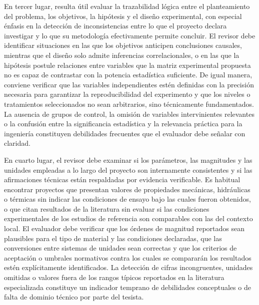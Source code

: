\documentclass[12pt,a4paper]{report}
\begin{document}
En tercer lugar, resulta útil evaluar la trazabilidad lógica entre el planteamiento del problema, los objetivos, la hipótesis y el diseño experimental, con especial énfasis en la detección de inconsistencias entre lo que el proyecto declara investigar y lo que su metodología efectivamente permite concluir. El revisor debe identificar situaciones en las que los objetivos anticipen conclusiones causales, mientras que el diseño solo admite inferencias correlacionales, o en las que la hipótesis postule relaciones entre variables que la matriz experimental propuesta no es capaz de contrastar con la potencia estadística suficiente. De igual manera, conviene verificar que las variables independientes estén definidas con la precisión necesaria para garantizar la reproducibilidad del experimento y que los niveles o tratamientos seleccionados no sean arbitrarios, sino técnicamente fundamentados. La ausencia de grupos de control, la omisión de variables intervinientes relevantes o la confusión entre la significancia estadística y la relevancia práctica para la ingeniería constituyen debilidades frecuentes que el evaluador debe señalar con claridad.

En cuarto lugar, el revisor debe examinar si los parámetros, las magnitudes y las unidades empleadas a lo largo del proyecto son internamente consistentes y si las afirmaciones técnicas están respaldadas por evidencia verificable. Es habitual encontrar proyectos que presentan valores de propiedades mecánicas, hidráulicas o térmicas sin indicar las condiciones de ensayo bajo las cuales fueron obtenidos, o que citan resultados de la literatura sin evaluar si las condiciones experimentales de los estudios de referencia son comparables con las del contexto local. El evaluador debe verificar que los órdenes de magnitud reportados sean plausibles para el tipo de material y las condiciones declaradas, que las conversiones entre sistemas de unidades sean correctas y que los criterios de aceptación o umbrales normativos contra los cuales se compararán los resultados estén explícitamente identificados. La detección de cifras incongruentes, unidades omitidas o valores fuera de los rangos típicos reportados en la literatura especializada constituye un indicador temprano de debilidades conceptuales o de falta de dominio técnico por parte del tesista.
\end{document}
